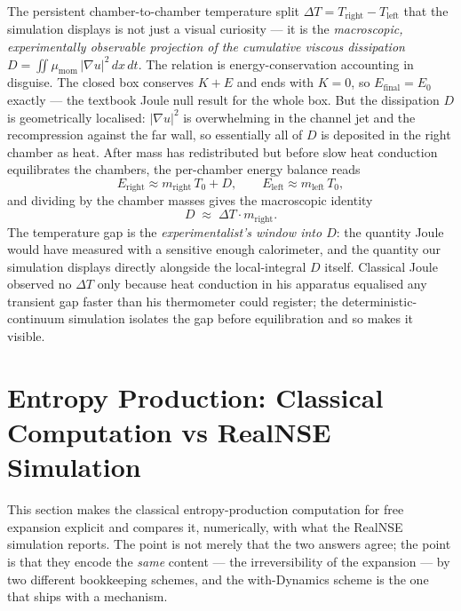The persistent chamber-to-chamber temperature split $\Delta T = T_{\mathrm{right}}-T_{\mathrm{left}}$
that the simulation displays is not just a visual curiosity --- it is the
\emph{macroscopic, experimentally observable projection of the cumulative
viscous dissipation} $D=\iint \mu_{\mathrm{mom}}\,|\nabla u|^2\,dx\,dt$. The
relation is energy-conservation accounting in disguise. The closed box conserves
$K+E$ and ends with $K=0$, so $E_{\mathrm{final}}=E_0$ exactly --- the textbook
Joule null result for the whole box. But the dissipation $D$ is geometrically
localised: $|\nabla u|^2$ is overwhelming in the channel jet and the
recompression against the far wall, so essentially all of $D$ is deposited in
the right chamber as heat. After mass has redistributed but before slow heat
conduction equilibrates the chambers, the per-chamber energy balance reads
\[
E_{\mathrm{right}} \approx m_{\mathrm{right}}\,T_0 + D, \qquad
E_{\mathrm{left}}  \approx m_{\mathrm{left}}\,T_0,
\]
and dividing by the chamber masses gives the macroscopic identity
\begin{equation}\label{deltaTD}
D \;\approx\; \Delta T \cdot m_{\mathrm{right}} .
\end{equation}
The temperature gap is the \emph{experimentalist's window into $D$}: the
quantity Joule would have measured with a sensitive enough calorimeter, and the
quantity our simulation displays directly alongside the local-integral $D$
itself. Classical Joule observed no $\Delta T$ only because heat conduction in
his apparatus equalised any transient gap faster than his thermometer could
register; the deterministic-continuum simulation isolates the gap before
equilibration and so makes it visible.

\section{Entropy Production: Classical Computation vs RealNSE Simulation}\label{sec:joule-entropy}

This section makes the classical entropy-production computation for free
expansion explicit and compares it, numerically, with what the RealNSE
simulation reports. The point is not merely that the two answers agree;
the point is that they encode the \emph{same} content --- the
irreversibility of the expansion --- by two different bookkeeping
schemes, and the with-Dynamics scheme is the one that ships with a
mechanism.

